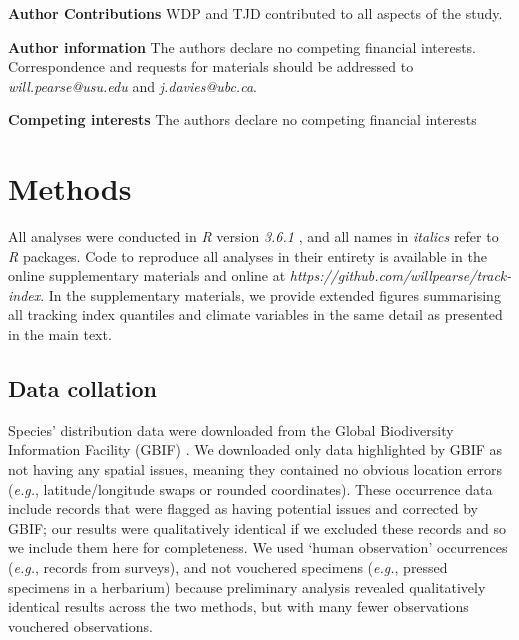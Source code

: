 \documentclass[12pt]{report}
\begin{document}
\textbf{Author Contributions} WDP and TJD contributed to all aspects
of the study.

\textbf{Author information} The authors declare no competing financial
interests. Correspondence and requests for materials should be
addressed to \emph{will.pearse@usu.edu} and \emph{j.davies@ubc.ca}.

\textbf{Competing interests} The authors declare no competing
financial interests

\clearpage

\section*{\Large Methods}
\renewcommand{\figurename}{Extended Data Figure}
\renewcommand{\tablename}{Extended Data Table}
  
All analyses were conducted in \emph{R} version \emph{3.6.1}
\supercite{R2018}, and all names in \emph{italics} refer to \emph{R}
packages. Code to reproduce all analyses in their entirety is
available in the online supplementary materials and online at
\emph{https://github.com/willpearse/track-index}.  In the
supplementary materials, we provide extended figures summarising all
tracking index quantiles and climate variables in the same detail as
presented in the main text.

\subsection*{Data collation}

Species' distribution data were downloaded from the Global
Biodiversity Information Facility (GBIF)
\supercite{url_gbif,url_gbif_occurrences}. We downloaded only data
highlighted by GBIF as not having any spatial issues, meaning they
contained no obvious location errors (\emph{e.g.}, latitude/longitude
swaps or rounded coordinates). These occurrence data include records
that were flagged as having potential issues and corrected by GBIF;
our results were qualitatively identical if we excluded these records
and so we include them here for completeness. We used `human
observation' occurrences (\emph{e.g.}, records from surveys), and not
vouchered specimens (\emph{e.g.}, pressed specimens in a herbarium)
because preliminary analysis revealed qualitatively identical results
across the two methods, but with many fewer observations vouchered
observations.
\end{document}
